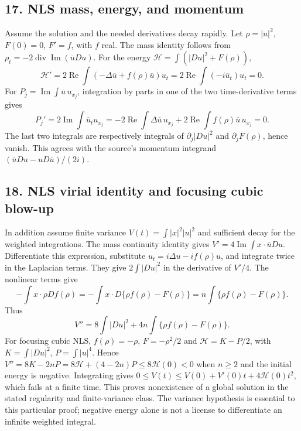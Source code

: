 \subsection*{17. NLS mass, energy, and momentum}
Assume the solution and the needed derivatives decay rapidly.
Let $\rho=|u|^2$, $F(0)=0$, $F'=f$, with $f$ real. The mass
identity follows from
$\rho_t=-2\operatorname{div}\operatorname{Im}(\overline uDu)$.
For the energy $\mathcal H=\int(|Du|^2+F(\rho))$,
\[
 \mathcal H'=2\operatorname{Re}\int
 (-\Delta\overline u+f(\rho)\overline u)u_t
 =2\operatorname{Re}\int(-i\overline u_t)u_t=0.
\]
For $P_j=\operatorname{Im}\int\overline u\,u_{x_j}$, integration
by parts in one of the two time-derivative terms gives
\[
 P_j'=2\operatorname{Im}\int\overline u_tu_{x_j}
 =-2\operatorname{Re}\int\Delta\overline u\,u_{x_j}
       +2\operatorname{Re}\int f(\rho)\overline u\,u_{x_j}=0.
\]
The last two integrals are respectively integrals of
$\partial_j|Du|^2$ and $\partial_jF(\rho)$, hence vanish.
This agrees with the source's momentum integrand
$(\overline uDu-uD\overline u)/(2i)$.

\subsection*{18. NLS virial identity and focusing cubic blow-up}
In addition assume finite variance $V(t)=\int|x|^2|u|^2$ and
sufficient decay for the weighted integrations. The mass continuity
identity gives
$V'=4\operatorname{Im}\int x\cdot\overline uDu$.
Differentiate this expression, substitute
$u_t=i\Delta u-if(\rho)u$, and integrate twice in the Laplacian
terms. They give $2\int|Du|^2$ in the derivative of $V'/4$.
The nonlinear terms give
\[
 -\int x\cdot\rho Df(\rho)
 =-\int x\cdot D\{\rho f(\rho)-F(\rho)\}
 =n\int\{\rho f(\rho)-F(\rho)\}.
\]
Thus
\begin{equation}\label{eq:12-nls-virial}
 V''=8\int|Du|^2+4n\int\{\rho f(\rho)-F(\rho)\}.
\end{equation}
For focusing cubic NLS, $f(\rho)=-\rho$, $F=-\rho^2/2$ and
$\mathcal H=K-P/2$, with $K=\int|Du|^2$, $P=\int|u|^4$.
Hence $V''=8K-2nP=8\mathcal H+(4-2n)P\le8\mathcal H(0)<0$
when $n\ge2$ and the initial energy is negative.
Integrating gives
$0\le V(t)\le V(0)+V'(0)t+4\mathcal H(0)t^2$,
which fails at a finite time. This proves nonexistence of a global
solution in the stated regularity and finite-variance class.
The variance hypothesis is essential to this particular proof;
negative energy alone is not a license to differentiate an infinite
weighted integral.
